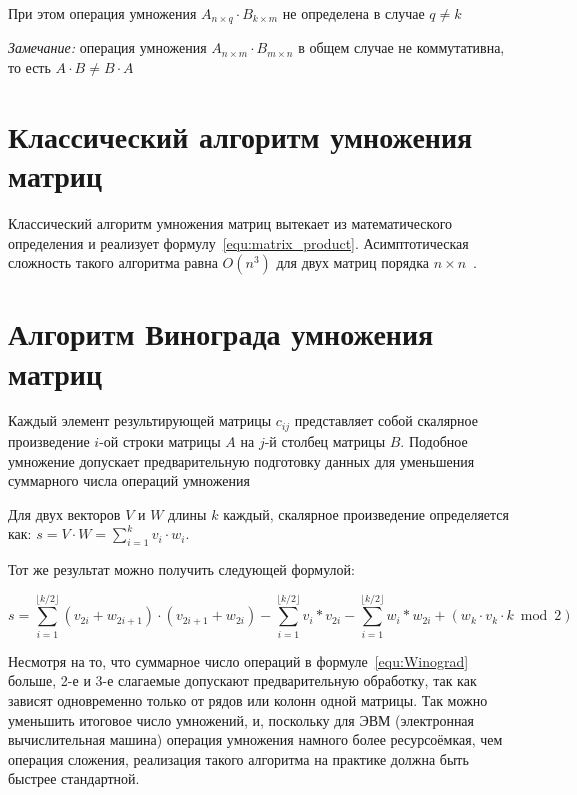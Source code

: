 При этом операция умножения $A_{n \times q} \cdot B_{k \times m}$ не определена в случае $q \neq k$

\textit{Замечание:} операция умножения $A_{n \times m} \cdot B_{m \times n}$ в общем случае не коммутативна, то есть $A \cdot B \ne B \cdot A$

\section{Классический алгоритм умножения матриц}

Классический алгоритм умножения матриц вытекает из математического определения и реализует формулу~\eqref{equ:matrix_product}. Асимптотическая сложность такого алгоритма равна $O(n^3)$ для двух матриц порядка $n \times n$~\cite{book:stdmul_complexity}.

\section{Алгоритм Винограда умножения матриц}

Каждый элемент результирующей матрицы $c_{ij}$ представляет собой скалярное произведение $i$-ой строки матрицы $A$ на $j$-й столбец матрицы $B$. Подобное умножение допускает предварительную подготовку данных для уменьшения суммарного числа операций умножения~\cite{book:Winograd}

Для двух векторов  $V$ и $W$ длины $k$ каждый, скалярное произведение определяется как: $s = V \cdot W = \sum_{i=1}^{k} v_{i} \cdot w_{i}$.

Тот же результат можно получить следующей формулой:

\begin{equation}
	\label{equ:Winograd}
	s = \sum_{i=1}^{\lfloor k/2 \rfloor}{(v_{2i} + w_{2i + 1})\cdot(v_{2i+1} + w_{2i})} - \sum_{i=1}^{\lfloor k/2 \rfloor}{v_{i}*v_{2i}} - \sum_{i=1}^{\lfloor k/2 \rfloor}{w_{i}*w_{2i}} + (w_{k}\cdot v_{k} \cdot k \bmod 2)
\end{equation}

Несмотря на то, что суммарное число операций в формуле~\eqref{equ:Winograd} больше, 2-е и 3-е слагаемые допускают предварительную обработку, так как зависят одновременно только от рядов или колонн одной матрицы. Так можно уменьшить итоговое число умножений, и, поскольку для ЭВМ (электронная вычислительная машина) операция умножения намного более ресурсоёмкая, чем операция сложения, реализация такого алгоритма на практике должна быть быстрее стандартной.


